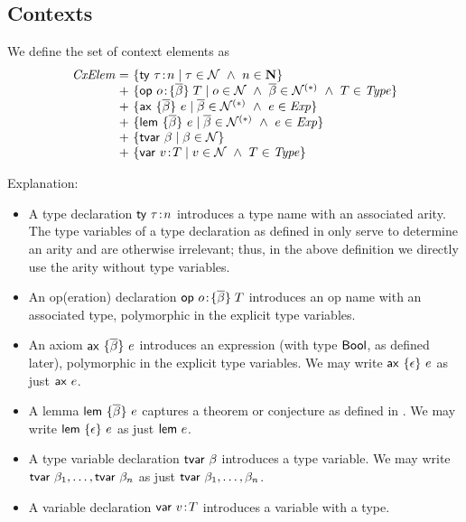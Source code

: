 \subsection{Contexts}

We define the set of context elements as
\[
\setdefVI
 {\Cxel}
 {+}
 {\setST{\tdecO}{\tnam\in\Nam\AND n\in\N}}
 {\setST{\odecO}{\onam\in\Nam\AND\tvarS\in\SeqNR{\Nam}\AND\typ\in\Typ}}
 {\setST{\axO}{\tvarS\in\SeqNR{\Nam}\AND\expr\in\Expr}}
 {\setST{\lemO}{\tvarS\in\SeqNR{\Nam}\AND\expr\in\Expr}}
 {\setST{\tvdecO}{\tvar\in\Nam}}
 {\setST{\vdecO}{\var\in\Nam\AND\typ\in\Typ}}
\]

Explanation:
\begin{itemize}
\item
A type declaration $\mathsf{ty}\ \tau\!:\!n$ introduces a type name with an associated arity.
The type variables of a type declaration as defined in \cite{lm} only serve to
determine an arity and are otherwise irrelevant; thus, in the above definition
we directly use the arity without type variables.
\item
An op(eration) declaration $\mathsf{op}\ o\!:\!\{\overline{\beta}\}\;T$ introduces an op name with an associated
type, polymorphic in the explicit type variables.
\item
An axiom $\mathsf{ax}\ \{\overline{\beta}\}\ e$ introduces an expression (with type $\mathsf{Bool}$, as defined
later), polymorphic in the explicit type variables. We may write
$\mathsf{ax}\ \{\epsilon\}\ e$ as just $\mathsf{ax}\ e$.
\item
A lemma $\mathsf{lem}\ \{\overline{\beta}\}\ e$ captures a theorem or conjecture as defined in \cite{lm}. We
may write $\mathsf{lem}\ \{\epsilon\}\ e$ as just $\mathsf{lem}\ e$.
\item
A type variable declaration $\mathsf{tvar}\ \beta$ introduces a type variable. We may write
$\mathsf{tvar}\ \beta_1,\ldots,\mathsf{tvar}\ \beta_n$ as just
$\mathsf{tvar}\ \beta_1,\ldots,\beta_n$.
\item
A variable declaration $\mathsf{var}\ v\!:\!T$ introduces a variable with a type.
\end{itemize}

